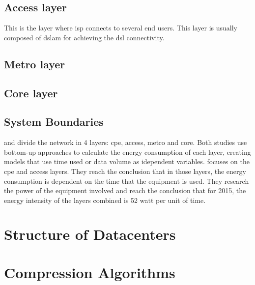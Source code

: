 \subsection{Access layer}

This is the layer where \ac{isp} connects to several end users. This layer is usually composed of \ac{dslam} for achieving the \ac{dsl} connectivity.

\subsection{Metro layer}    

\subsection{Core layer}

\subsection{System Boundaries}

\citet{Coroama2015} and \citet{Schien2015} divide the network in 4 layers: \ac{cpe}, access, metro and core. Both studies use bottom-up approaches to calculate the energy consumption of each layer, creating models that use time used or data volume as idependent variables.
\citet{Coroama2015} focuses on the \ac{cpe} and access layers. They reach the conclusion that
in those layers, the energy consumption is dependent on the time that the equipment is used.
They research the power of the equipment involved and reach the conclusion that for 2015,
the energy intensity of the layers combined is 52 \ac{watt} per unit of time.

\section{Structure of Datacenters}

\section{Compression Algorithms}